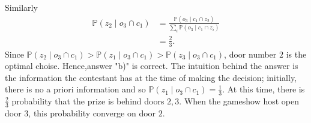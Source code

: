 \begin{example}
	Similarly
	\begin{equation}
		\begin{split}
			\mathbb{P}(z_2\mid o_3 \cap c_1) &= \frac{\mathbb{P}(o_3\mid c_1 \cap z_2)}{\sum_i\mathbb{P}(o_3\mid c_1 \cap z_i)}\\
			&=\frac{2}{3}.
		\end{split}
	\end{equation}
	Since $\mathbb{P}(z_2\mid o_3 \cap c_1)>\mathbb{P}(z_1\mid o_3 \cap c_1)>\mathbb{P}(z_3\mid o_3 \cap c_1)$, door number $2$ is the optimal choise. Hence,answer "b)" is correct. The intuition behind the answer is the information the contestant has at the time of making the decision; initially, there is no a priori information and so $\mathbb{P}(z_1\mid o_3 \cap c_1)=\frac{1}{3}$. At this time, there is $\frac{2}{3}$ probability that the prize is behind doors $2,3$. When the gameshow host open door $3$, this probability converge on door $2$.
\end{example}

